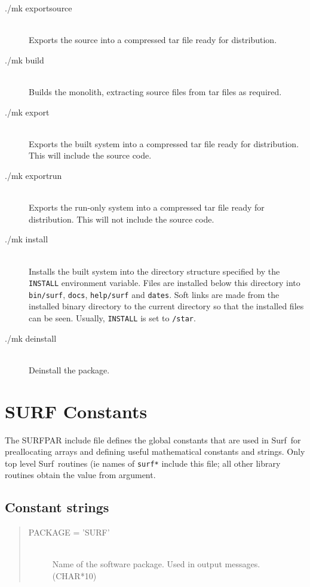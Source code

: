 \documentclass[twoside,11pt]{article}
\newcommand{\scusoft}          {{\sc Surf}}
\renewcommand{\_}{\texttt{\symbol{95}}}
\begin{document}
\begin{description}

\item[./mk export\_source] \mbox{} \\
   Exports the source into a compressed tar file ready for distribution.
\item[./mk build] \mbox{} \\
   Builds the monolith, extracting source files from tar files as required.
\item[./mk export] \mbox{} \\
   Exports the built system into a compressed tar file ready for distribution.
This will include the source code.
\item[./mk export\_run] \mbox{} \\
   Exports the run-only system into a compressed tar file ready for
distribution. This will not include the source code.
\item[./mk install] \mbox{} \\
  Installs the built system into the directory structure specified by the
\texttt{INSTALL} environment variable. Files are installed below this
directory into \texttt{bin/surf}, \texttt{docs}, \texttt{help/surf}
and \texttt{dates}. Soft links are made from the installed binary directory
to the current directory so that the installed files can be seen.
Usually, \texttt{INSTALL} is set to \texttt{/star}.
\item[./mk deinstall] \mbox{} \\
  Deinstall the package.
\end{description}

\section{SURF Constants\label{app:const}}

The SURF\_PAR include file defines the global constants that are used
in \scusoft\ for preallocating arrays and defining useful mathematical
constants and strings. Only top level \scusoft\ routines (ie names of
\texttt{surf\_*} include this file; all other library routines
obtain the value from argument.

\subsection{Constant strings}

\begin{quote}
\begin{description}
  \item[PACKAGE = 'SURF'] \mbox{} \\
    Name of the software package. Used in output messages. (CHAR*10)
\end{description}
\end{quote}
\end{document}
